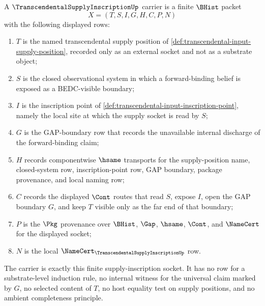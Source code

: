 \begin{definition}
\label{def:transcendental-supply-inscription-carrier}
A $\TranscendentalSupplyInscriptionUp$ carrier is a finite $\BHist$ packet
$$
X=(T,S,I,G,H,C,P,N)
$$
with the following displayed rows:
\begin{enumerate}
\item $T$ is the named transcendental supply position of \autoref{def:transcendental-input-supply-position}, recorded only as an external socket and not as a substrate object;
\item $S$ is the closed observational system in which a forward-binding belief is exposed as a BEDC-visible boundary;
\item $I$ is the inscription point of \autoref{def:transcendental-input-inscription-point}, namely the local site at which the supply socket is read by $S$;
\item $G$ is the GAP-boundary row that records the unavailable internal discharge of the forward-binding claim;
\item $H$ records componentwise $\hsame$ transports for the supply-position name, closed-system row, inscription-point row, GAP boundary, package provenance, and local naming row;
\item $C$ records the displayed $\Cont$ routes that read $S$, expose $I$, open the GAP boundary $G$, and keep $T$ visible only as the far end of that boundary;
\item $P$ is the $\Pkg$ provenance over $\BHist$, $\Gap$, $\hsame$, $\Cont$, and $\NameCert$ for the displayed socket;
\item $N$ is the local $\NameCert_{\TranscendentalSupplyInscriptionUp}$ row.
\end{enumerate}
The carrier is exactly this finite supply-inscription socket. It has no row for a substrate-level induction rule, no internal witness for the universal claim marked by $G$, no selected content of $T$, no host equality test on supply positions, and no ambient completeness principle.
\end{definition}


